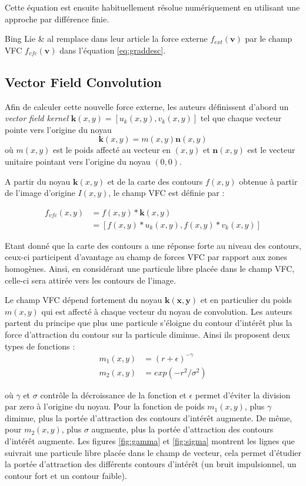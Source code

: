 Cette équation est ensuite habituellement résolue numériquement en utilisant une approche par différence finie.

Bing Lie \& al remplace dans leur article la force externe $f_{ext}(\mathbf{v})$ par le champ VFC $f_{vfc}(\mathbf{v})$ dans l'équation \ref{eq:graddesc}.

\subsection{Vector Field Convolution}

Afin de calculer cette nouvelle force externe, les auteurs définissent d'abord un \textit{vector field kernel} $\mathbf{k}(x,y)=[u_k(x,y),v_k(x,y)]$ tel que chaque vecteur pointe vers l'origine du noyau 
\begin{equation}
	\mathbf{k}(x,y)=m(x,y)\mathbf{n}(x,y)
\end{equation}
où $m(x,y)$ est le poids affecté au vecteur en $(x,y)$ et $\mathbf{n}(x,y)$ est le vecteur unitaire pointant vers l'origine du noyau $(0,0)$.

A partir du noyau $\mathbf{k}(x,y)$ et de la carte des contours $f(x,y)$ obtenue à partir de l'image d'origine $I(x,y)$, le champ VFC est définie par :

\begin{align*}
	f_{vfc}(x,y) & = f(x,y)*\mathbf{k}(x,y) \\
				 & = [f(x,y)*u_k(x,y),f(x,y)*v_k(x,y)]
\end{align*}

Etant donné que la carte des contours a une réponse forte au niveau des contours, ceux-ci participent d'avantage au champ de forces VFC par rapport aux zones homogènes. Ainsi, en considérant une particule libre placée dans le champ VFC, celle-ci sera attirée vers les contours de l'image. 

Le champ VFC dépend fortement du noyau $\mathbf{k(x,y)}$ et en particulier du poids $m(x,y)$ qui est affecté à chaque vecteur du noyau de convolution. Les auteurs partent du principe que plus une particule s'éloigne du contour d'intérêt plus la force d'attraction du contour sur la particule diminue. Ainsi ils proposent deux types de fonctions :
\begin{align}
	m_1(x,y) & = (r+\epsilon)^{-\gamma} \\
	m_2(x,y) & = exp(-r^2/\sigma^2)
\end{align}

où $\gamma$ et $\sigma$ contrôle la décroissance de la fonction et $\epsilon$ permet d'éviter la division par zero à l'origine du noyau. Pour la fonction de poids $m_1(x,y)$, plus $\gamma$ diminue, plus la portée d'attraction des contours d'intérêt augmente. De même, pour $m_2(x,y)$, plus $\sigma$ augmente, plus la portée d'attraction des contours d'intérêt augmente. Les figures \ref{fig:gamma} et \ref{fig:sigma} montrent les lignes que suivrait une particule libre placée dans le champ de vecteur, cela permet d'étudier la portée d'attraction des différents contours d'intérêt (un bruit impulsionnel, un contour fort et un contour faible).



